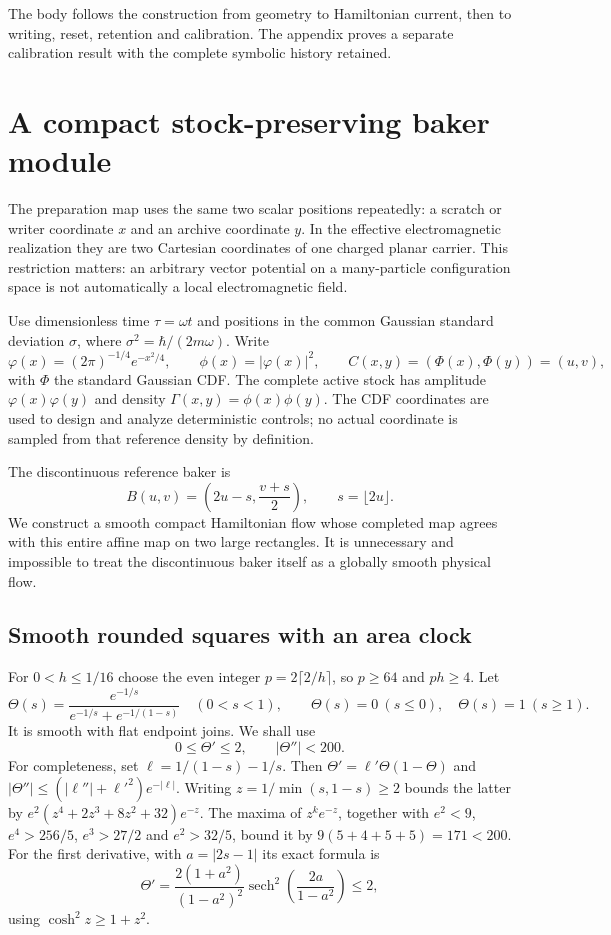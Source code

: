 \documentclass[11pt]{article}
\numberwithin{equation}{section}
\theoremstyle{definition}
\theoremstyle{remark}
\begin{document}
The body follows the construction from geometry to Hamiltonian current,
then to writing, reset, retention and calibration. The appendix proves a
separate calibration result with the complete symbolic history retained.

\section{A compact stock-preserving baker module}
\label{p2c:sec:geometry}

The preparation map uses the same two scalar positions repeatedly:
a scratch or writer coordinate $x$ and an archive coordinate $y$.
In the effective electromagnetic realization they are two Cartesian
coordinates of one charged planar carrier. This restriction matters:
an arbitrary vector potential on a many-particle configuration space
is not automatically a local electromagnetic field.

Use dimensionless time $\tau=\omega t$ and positions in the common
Gaussian standard deviation $\sigma$, where
$\sigma^2=\hbar/(2m\omega)$. Write
\[
 \varphi(x)=(2\pi)^{-1/4}e^{-x^2/4},\qquad
 \phi(x)=|\varphi(x)|^2,\qquad
 C(x,y)=(\Phi(x),\Phi(y))=(u,v),
\]
with $\Phi$ the standard Gaussian CDF. The complete active stock
has amplitude $\varphi(x)\varphi(y)$ and density
$\Gamma(x,y)=\phi(x)\phi(y)$. The CDF coordinates are used to
design and analyze deterministic controls; no actual coordinate
is sampled from that reference density by definition.

The discontinuous reference baker is
\begin{equation}\label{p2c:eq:baker}
 B(u,v)=\left(2u-s,\frac{v+s}{2}\right),
 \qquad s=\lfloor2u\rfloor .
\end{equation}
We construct a smooth compact Hamiltonian flow whose completed
map agrees with this entire affine map on two large rectangles.
It is unnecessary and impossible to treat the discontinuous
baker itself as a globally smooth physical flow.

\subsection{Smooth rounded squares with an area clock}

For $0<h\leq1/16$ choose the even integer
$p=2\lceil2/h\rceil$, so $p\geq64$ and $ph\geq4$.
Let
\[
 \Theta(s)=
 \frac{e^{-1/s}}{e^{-1/s}+e^{-1/(1-s)}}\quad(0<s<1),
 \qquad
 \Theta(s)=0\ (s\leq0),\quad\Theta(s)=1\ (s\geq1).
\]
It is smooth with flat endpoint joins. We shall use
\begin{equation}\label{p2c:eq:stepbounds}
 0\leq\Theta'\leq2,\qquad |\Theta''|<200.
\end{equation}
For completeness, set
$\ell=1/(1-s)-1/s$. Then
$\Theta'=\ell'\Theta(1-\Theta)$ and
$|\Theta''|\leq(|\ell''|+\ell'^2)e^{-|\ell|}$.
Writing $z=1/\min(s,1-s)\geq2$ bounds the latter by
$e^2(z^4+2z^3+8z^2+32)e^{-z}$.
The maxima of $z^ke^{-z}$, together with
$e^2<9$, $e^4>256/5$, $e^3>27/2$ and $e^2>32/5$,
bound it by $9(5+4+5+5)=171<200$.
For the first derivative, with $a=|2s-1|$ its exact formula is
\[
 \Theta'=
 \frac{2(1+a^2)}{(1-a^2)^2}
 \operatorname{sech}^2\!\left(\frac{2a}{1-a^2}\right)
 \leq2,
\]
using $\cosh^2 z\geq1+z^2$.
\end{document}
